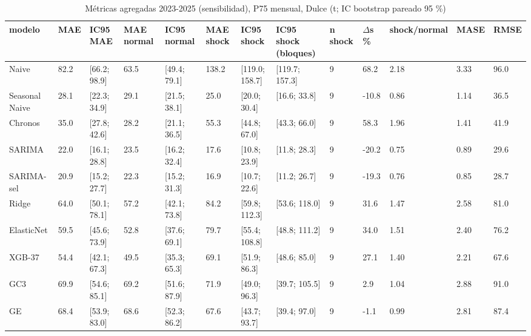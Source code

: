 \begin{table}[H]
\centering
\small
\caption{Métricas agregadas 2023-2025 (sensibilidad), P75 mensual, Dulce (t; IC bootstrap pareado 95 \%)}
\label{tab:T06_agregadas_P75_sensibilidad_2023_2025_dulce}
\begin{tabular}{lllllllllllll}
\toprule
modelo & MAE & IC95 MAE & MAE normal & IC95 normal & MAE shock & IC95 shock & IC95 shock (bloques) & n shock & $\Delta$s \% & shock/normal & MASE & RMSE \\
\midrule
Naive & 82.2 & [66.2; 98.9] & 63.5 & [49.4; 79.1] & 138.2 & [119.0; 158.7] & [119.7; 157.3] & 9 & 68.2 & 2.18 & 3.33 & 96.0 \\
Seasonal Naive & 28.1 & [22.3; 34.9] & 29.1 & [21.5; 38.1] & 25.0 & [20.0; 30.4] & [16.6; 33.8] & 9 & -10.8 & 0.86 & 1.14 & 36.5 \\
Chronos & 35.0 & [27.8; 42.6] & 28.2 & [21.1; 36.5] & 55.3 & [44.8; 67.0] & [43.3; 66.0] & 9 & 58.3 & 1.96 & 1.41 & 41.9 \\
SARIMA & 22.0 & [16.1; 28.8] & 23.5 & [16.2; 32.4] & 17.6 & [10.8; 23.9] & [11.8; 28.3] & 9 & -20.2 & 0.75 & 0.89 & 29.6 \\
SARIMA-sel & 20.9 & [15.2; 27.7] & 22.3 & [15.2; 31.3] & 16.9 & [10.7; 22.6] & [11.2; 26.7] & 9 & -19.3 & 0.76 & 0.85 & 28.7 \\
Ridge & 64.0 & [50.1; 78.1] & 57.2 & [42.1; 73.8] & 84.2 & [59.8; 112.3] & [53.6; 118.0] & 9 & 31.6 & 1.47 & 2.58 & 81.0 \\
ElasticNet & 59.5 & [45.6; 73.9] & 52.8 & [37.6; 69.1] & 79.7 & [55.4; 108.8] & [48.8; 111.2] & 9 & 34.0 & 1.51 & 2.40 & 76.2 \\
XGB-37 & 54.4 & [42.1; 67.3] & 49.5 & [35.3; 65.3] & 69.1 & [51.9; 86.3] & [48.6; 85.0] & 9 & 27.1 & 1.40 & 2.21 & 67.6 \\
GC3 & 69.9 & [54.6; 85.1] & 69.2 & [51.6; 87.9] & 71.9 & [49.0; 96.3] & [39.7; 105.5] & 9 & 2.9 & 1.04 & 2.88 & 91.0 \\
GE & 68.4 & [53.9; 83.0] & 68.6 & [52.3; 86.2] & 67.6 & [43.7; 93.7] & [39.4; 97.0] & 9 & -1.1 & 0.99 & 2.81 & 87.4 \\
\bottomrule
\end{tabular}
\end{table}